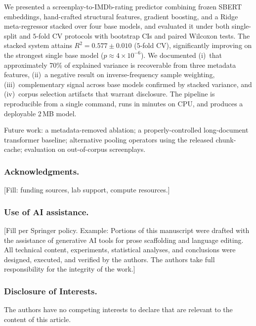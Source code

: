 \documentclass[runningheads]{llncs}
\begin{document}
We presented a screenplay-to-IMDb-rating predictor combining
frozen SBERT embeddings, hand-crafted structural features,
gradient boosting, and a Ridge meta-regressor stacked over four
base models, and evaluated it under both single-split and $5$-fold
CV protocols with bootstrap CIs and paired Wilcoxon tests. The
stacked system attains $R^{2} = 0.577 \pm 0.010$ ($5$-fold CV),
significantly improving on the strongest single base model
($p \approx 4 \times 10^{-6}$). We documented (i)~that
approximately 70\% of explained variance is recoverable from
three metadata features, (ii)~a negative result on
inverse-frequency sample weighting, (iii)~complementary signal
across base models confirmed by stacked variance, and (iv)~corpus
selection artifacts that warrant disclosure. The pipeline is
reproducible from a single command, runs in minutes on CPU, and
produces a deployable 2\,MB model.

Future work: a metadata-removed ablation; a properly-controlled
long-document transformer baseline; alternative pooling operators
using the released chunk-cache; evaluation on out-of-corpus
screenplays.


\subsubsection*{Acknowledgments.}
[Fill: funding sources, lab support, compute resources.]

\subsubsection*{Use of AI assistance.}
[Fill per Springer policy. Example: Portions of this manuscript
were drafted with the assistance of generative AI tools for
prose scaffolding and language editing. All technical content,
experiments, statistical analyses, and conclusions were designed,
executed, and verified by the authors. The authors take full
responsibility for the integrity of the work.]

\subsubsection*{Disclosure of Interests.}
The authors have no competing interests to declare that are
relevant to the content of this article.
\end{document}
